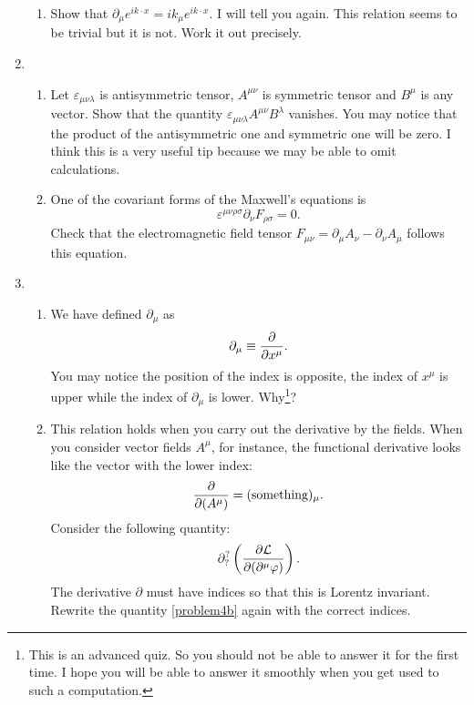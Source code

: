 \documentclass[a4paper,pdftex]{article}
\begin{document}
\begin{enumerate}
\begin{enumerate}
      \item 
      Show that $\partial_{\mu}e^{ik\cdot x}=ik_{\mu}e^{ik\cdot x}$. I will tell you again. This relation seems to be trivial but it is not. Work it out precisely.
   \end{enumerate}

   \item 
   \begin{enumerate}
      \item 
      Let $\varepsilon_{\mu\nu\lambda}$ is  antisymmetric tensor, $A^{\mu\nu}$ is  symmetric tensor and $B^{\mu}$ is any vector. Show that the quantity $\varepsilon_{\mu\nu\lambda}A^{\mu\nu}B^{\lambda}$ vanishes. You may notice that the product of the antisymmetric one and symmetric one will be zero. I think this is a very useful tip because we may be able to omit calculations.
      
      \item 
      One of the covariant forms of the Maxwell's equations is
      \begin{equation}
         \varepsilon^{\mu\nu\rho\sigma}\partial_{\nu}F_{\rho\sigma}
         =
         0
         .
      \end{equation}
      Check that the electromagnetic field tensor $F_{\mu\nu}=\partial_{\mu}A_{\nu}-\partial_{\nu}A_{\mu}$ follows this equation. 
   \end{enumerate}
   
   \item 
   \begin{enumerate}
      \item 
      We have defined $\partial_{\mu}$ as
      \begin{equation}
         \partial_{\mu}
         \equiv
         \pdv{}{x^{\mu}}
         .
      \end{equation}
      You may notice the position of the index is opposite, the index of $x^{\mu}$ is upper while the index of $\partial_{\mu}$ is lower. Why\footnote{
         This is an advanced quiz. So you should not be able to answer it for the first time. I hope you will be able to answer it smoothly when you get used to such a computation.
      }?

      \item 
      This relation holds when you carry out the derivative by the fields. When you consider vector fields $A^{\mu}$, for instance, the functional derivative looks like the vector with the lower index:
      \begin{equation}
         \pdv{}{(A^{\mu})}
         =
         (\text{something})_{\mu}
         .
      \end{equation}
      Consider the following quantity:
      \begin{equation}
         \partial_{?}^{?}
         \left(  
            \pdv{\mathcal{L}}{(\partial^{\mu}\varphi)}
         \right)
         .
         \label{problem4b}
      \end{equation}
      The derivative $\partial$ must have indices so that this is Lorentz invariant. Rewrite the quantity \eqref{problem4b} again with the correct indices.
   \end{enumerate}


\end{enumerate}
\end{document}
